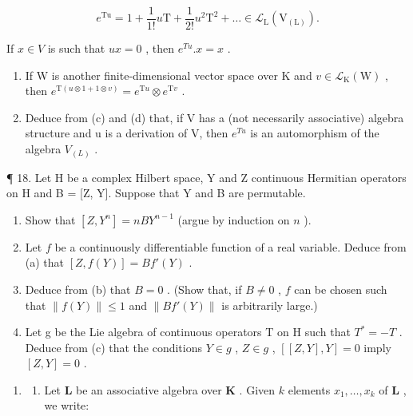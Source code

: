 \[
e ^ {\mathrm{Tu}} = 1 + \frac {1}{1 !} u \mathrm{T} + \frac {1}{2 !} u ^ {2} \mathrm{T} ^ {2} + \dots \in \mathcal {L} _ {\mathrm{L}} (\mathrm{V} _ {(\mathrm{L})}).
\]

If \(x \in V\) is such that \(ux = 0\) , then \(e^{Tu}.x = x\) .

\begin{enumerate}
\def\labelenumi{(\alph{enumi})}
\setcounter{enumi}{3}
\item
  If W is another finite-dimensional vector space over K and \(v \in \mathcal{L}_{\mathrm{K}}(\mathrm{W})\) , then \(e^{\mathrm{T}(u \otimes 1 + 1 \otimes v)} = e^{\mathrm{T}u} \otimes e^{\mathrm{T}v}\) .
\item
  Deduce from (c) and (d) that, if V has a (not necessarily associative) algebra structure and u is a derivation of V, then \(e^{Tu}\) is an automorphism of the algebra \(V_{(L)}\) .
\end{enumerate}

¶ 18. Let H be a complex Hilbert space, Y and Z continuous Hermitian operators on H and B = {[}Z, Y{]}. Suppose that Y and B are permutable.

\begin{enumerate}
\def\labelenumi{(\alph{enumi})}
\item
  Show that \([Z, Y^n] = nBY^{n-1}\) (argue by induction on \(n\) ).
\item
  Let \(f\) be a continuously differentiable function of a real variable. Deduce from (a) that \([Z, f(Y)] = Bf'(Y)\) .
\item
  Deduce from (b) that \(B = 0\) . (Show that, if \(B \neq 0\) , \(f\) can be chosen such that \(\| f(Y) \| \leqslant 1\) and \(\| Bf'(Y) \|\) is arbitrarily large.)
\item
  Let g be the Lie algebra of continuous operators T on H such that \(T^{*} = -T\) . Deduce from (c) that the conditions \(Y \in g\) , \(Z \in g\) , \([[Z, Y], Y] = 0\) imply \([Z, Y] = 0\) .
\end{enumerate}

\begin{enumerate}
\def\labelenumi{\arabic{enumi}.}
\setcounter{enumi}{18}
\tightlist
\item
  \begin{enumerate}
  \def\labelenumii{(\alph{enumii})}
  \tightlist
  \item
    Let \(\mathbf{L}\) be an associative algebra over \(\mathbf{K}\) . Given \(k\) elements \(x_{1},\ldots ,x_{k}\) of \(\mathbf{L}\) , we write:
  \end{enumerate}
\end{enumerate}

